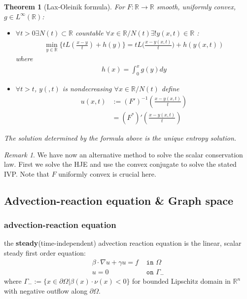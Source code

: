 \documentclass[a4paper,11pt,oneside,fleqn]{book}
\newtheorem{theorem}{Theorem}[section]
\theoremstyle{definition}
\theoremstyle{remark}
\newtheorem*{remark}{Remark}
\begin{document}
\begin{theorem}[Lax-Oleinik formula]
For $F: \mathbb{R} \rightarrow \mathbb{R}$ smooth, uniformly convex, $ g \in L^\infty(\mathbb{R})$: 
	\begin{itemize}
		\item $\forall t > 0 \exists N(t) \subset \mathbb{R}$ countable $\forall x \in \mathbb{R} \slash N(t) \exists !y(x, t) \in \mathbb{R}$ :
			\begin{align*}
				\min_{y \in \mathbb{R}} \bigg\{ t L(\frac{x - y}{t}) + h(y) \bigg\} = t L\bigg(\frac{x - y(x, t)}{t}\bigg) + h(y(x, t))
			\end{align*}
			where
			\begin{align*}
				h(x) = \int_0^x g(y) dy
			\end{align*}
		\item $\forall t > t$,  $y(, t)$ is nondecreasing $\forall x \in \mathbb{R} \slash N(t)$ define
			\begin{align*}
				u(x, t) &:= (F')^{-1}(\frac{x - y(x, t)}{t})\\
				&= (F^*)'(\frac{x - y(x, t)}{t})
			\end{align*}
	\end{itemize}
	The solution determined by the formula above is the unique entropy solution. 
\end{theorem}
\begin{remark}
We have now an alternative method to solve the scalar conservation law. First we solve the HJE and use the convex conjugate to solve the stated IVP. Note that $F$ uniformly convex is crucial here. 	
\end{remark}



\subsection{Advection-reaction equation \& Graph space}
\subsubsection{advection-reaction equation}

the \textbf{steady}(time-independent) advection reaction equation is the linear, scalar steady first order equation:
\begin{align*}
	\beta \cdot \nabla u + \gamma  u = f &\texttt{ in }\Omega \\
	u = 0  &\texttt{ on } \Gamma_-
\end{align*}
where $\Gamma_-:= \{x \in \partial \Omega | \beta(x) \cdot \nu(x) < 0\}$ for bounded Lipschitz domain in $\mathbb{R}^n$ with negative outflow along $\partial \Omega$. 
\end{document}
